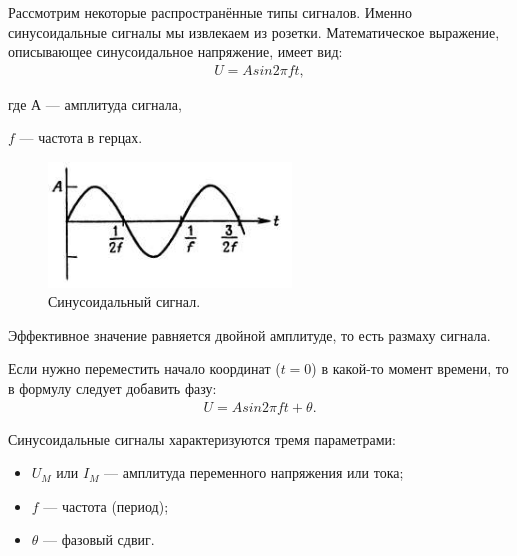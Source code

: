	Рассмотрим некоторые распространённые типы сигналов.
	Именно синусоидальные сигналы мы извлекаем из розетки. Математическое выражение, описывающее синусоидальное напряжение, имеет вид:
	\begin{gather}
	U=A sin2 \pi ft,
	\end{gather}
	
	где А --- амплитуда сигнала,
	
	$f$ --- частота в герцах.

	\begin{figure}[H]
    \centering
    \includegraphics[width=0.575\textwidth]{../image/s_sin.png}
    \caption{Синусоидальный сигнал.}
	\end{figure}
	Эффективное значение равняется двойной амплитуде, то есть размаху сигнала. 

	Если нужно переместить начало координат ($t=0$) в какой-то момент времени, то в формулу следует добавить фазу:
	\begin{gather}
	U=A sin2 \pi ft + \theta.
	\end{gather}
	
	Синусоидальные сигналы характеризуются тремя параметрами:
	\begin{itemize}
		\item $U_{M}$ или $I_{M}$ --- амплитуда переменного напряжения или тока;
		\item $f$ --- частота (период);
		\item $\theta$ --- фазовый сдвиг.
	\end{itemize}

	
	

